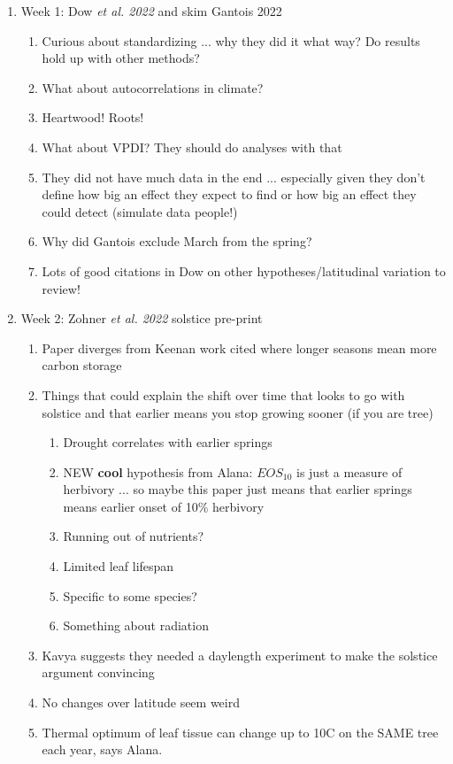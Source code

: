 \documentclass[11pt,letter]{article}
\begin{document}
\begin{enumerate}
\item Week 1: Dow \emph{et al. 2022} and skim Gantois 2022
\begin{enumerate}
\item Curious about standardizing ... why they did it what way? Do results hold up with other methods?
\item What about autocorrelations in climate?
\item Heartwood! Roots!
\item What about VPDI? They should do analyses with that
\item They did not have much data in the end ... especially given they don't define how big an effect they expect to find or how big an effect they could detect (simulate data people!)
\item Why did Gantois exclude March from the spring?
\item Lots of good citations in Dow on other hypotheses/latitudinal variation to review!
\end{enumerate}
\item Week 2: Zohner \emph{et al. 2022} solstice pre-print
\begin{enumerate}
\item Paper diverges from Keenan work cited where longer seasons mean more carbon storage
\item Things that could explain the shift over time that looks to go with solstice and that earlier means you stop growing sooner (if you are  tree)
\begin{enumerate}
\item Drought correlates with earlier springs
\item NEW {\bf cool} hypothesis from Alana: $EOS_{10}$ is just a measure of herbivory ... so maybe this paper just means that earlier springs means earlier onset of 10\% herbivory 
\item Running out of nutrients?
\item Limited leaf lifespan
\item Specific to some species?
\item Something about radiation
\end{enumerate}
\item Kavya suggests they needed a daylength experiment to make the solstice argument convincing 
\item No changes over latitude seem weird 
\item Thermal optimum of leaf tissue can change up to 10C on the SAME tree each year, says Alana. 

\end{enumerate}
\end{enumerate}
\end{document}
